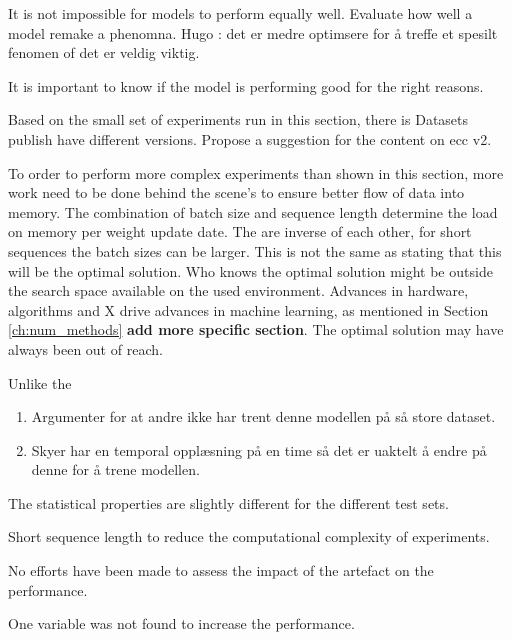 It is not impossible for models to perform equally well. Evaluate how well a model remake a phenomna. Hugo : det er medre optimsere for å treffe et spesilt fenomen of det er veldig viktig. 


It is important to know if the model is performing good for the right reasons.

Based on the small set of experiments run in this section, there is 
Datasets publish have different versions. Propose a suggestion for the content on \acrshort{ecc} v2.

To order to perform more complex experiments than shown in this section, more work need to be done behind the scene's to ensure better flow of data into memory. The combination of batch size and sequence length determine the load on memory per weight update date. The are inverse of each other, for short sequences the batch sizes can be larger. This is not the same as stating that this will be the optimal solution. Who knows the optimal solution might be outside the search space available on the used environment. Advances in hardware, algorithms and X drive advances in machine learning, as mentioned in Section \ref{ch:num_methods} \textbf{add more specific section}. The optimal solution may have always been out of reach. 

Unlike the \cite{}



\begin{enumerate}
    \item Argumenter for at andre ikke har trent denne modellen på så store dataset. 
    \item Skyer har en temporal opplæsning på en time så det er uaktelt å endre på denne for å trene modellen. 
\end{enumerate}


The statistical properties are slightly different for the different test sets.  

Short sequence length to reduce the computational complexity of experiments. 

No efforts have been made to assess the impact of the artefact on the performance.

One variable was not found to increase the performance.



